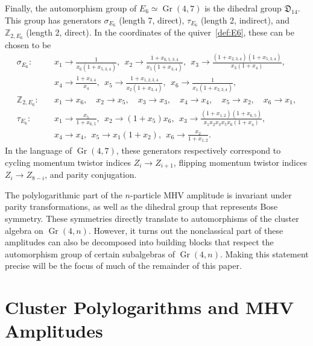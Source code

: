 \documentclass[12pt]{article}
\DeclareMathOperator{\Gr}{Gr}
\begin{document}
Finally, the automorphism group of $E_6 \simeq \Gr(4,7)$ is the dihedral group ${\mathfrak D}_{14}$. This group has generators $\sigma_{E_6}$ (length 7, direct), $\tau_{E_6}$ (length 2, indirect), and $\mathbb{Z}_{2,E_6}$ (length 2, direct). In the coordinates of the quiver~\eqref{def:E6}, these can be chosen to be 
\begin{align}
  \sigma_{E_6}:\quad 
    &x_1\to \frac{1}{x_6 (1+x_{5,3,4})},~~
    x_2\to \frac{1+x_{6,5,3,4}}{x_5 (1+x_{3,4})},~~
    x_3\to \frac{(1+x_{2,3,4}) (1+x_{5,3,4})}{x_3 (1+x_4)}, \nonumber \\
    &x_4\to \frac{1+x_{3,4}}{x_4},~~
    x_5\to \frac{1+x_{1,2,3,4}}{x_2 (1+x_{3,4})},~~
    x_6\to \frac{1}{x_1 (1+x_{2,3,4})},\nonumber \\[2ex]
  \mathbb{Z}_{2,E_6}:\quad 
    &x_1\to x_6, \quad x_2\to x_5, \quad x_3 \to x_3, \quad x_4 \to x_4, \quad x_5\to x_2, \quad x_6\to x_1, \\[2ex]
  \tau_{E_6}:\quad
    &x_1\to \frac{x_5}{1+x_{6,5}},~~
    x_2\to (1+x_5) x_6,~~
    x_3\to \frac{(1+x_{1,2}) (1+x_{6,5})}{x_1 x_2 x_3 x_5 x_6 (1+x_4)}, \nonumber \\
    &x_4\to x_4,~~
    x_5\to x_1 (1+x_2),~~
    x_6\to \frac{x_2}{1+x_{1,2}}. \nonumber
\end{align}
In the language of $\Gr(4,7)$, these generators respectively correspond to cycling momentum twistor indices $Z_i \to Z_{i+1}$, flipping momentum twistor indices $Z_i \to Z_{8-i}$, and parity conjugation. 

The polylogarithmic part of the $n$-particle MHV amplitude is invariant under parity transformations, as well as the dihedral group that represents Bose symmetry. These symmetries directly translate to automorphisms of the cluster algebra on $\Gr(4,n)$. However, it turns out the nonclassical part of these amplitudes can also be decomposed into building blocks that respect the automorphism group of certain subalgebras of $\Gr(4,n)$. Making this statement precise will be the focus of much of the remainder of this paper. 

\section{Cluster Polylogarithms and MHV Amplitudes} \label{sec:cluster_polylog_MHV_review}
\end{document}
